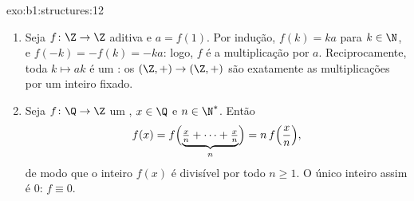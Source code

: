 \begin{solution}{exo:b1:structures:12}
\begin{enumerate}
  \item Seja $f \colon \Z \to \Z$ aditiva e $a = f(1)$. Por
        indução, $f(k) = ka$ para $k \in \N$, e $f(-k) = -f(k) =
        -ka$: logo, $f$ é a multiplicação por $a$. Reciprocamente,
        toda  $k \mapsto ak$ é um : os 
        $(\Z,+) \to (\Z,+)$ são exatamente as multiplicações por um
        inteiro fixado.
  \item Seja $f \colon \Q \to \Z$ um , $x \in \Q$ e
        $n \in \N^*$. Então
        \[
        f(x) = f\Bigl(\underbrace{\tfrac xn + \dots +
        \tfrac xn}_{n}\Bigr) = n\,f\Bigl(\frac xn\Bigr) ,
        \]
        de modo que o inteiro $f(x)$ é divisível por todo $n \geq 1$.
        O único inteiro assim é $0$: $f \equiv 0$.
\end{enumerate}
\end{solution}

